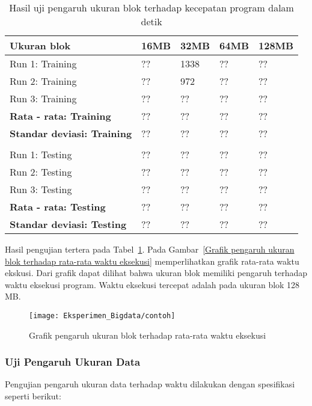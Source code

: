 \begin{table}[H]
\label{tab:uji pengaruh ukuran blok}
\centering
\caption{Hasil uji pengaruh ukuran blok terhadap kecepatan program dalam detik}
\begin{tabular}{ | l | l | l | l | l | }
\hline
Ukuran blok & 16MB & 32MB & 64MB & 128MB \\ \hline \hline
Run 1: Training & ?? & 1338 & ?? & ?? \\ \hline
Run 2: Training & ?? & 972 & ?? & ?? \\ \hline
Run 3: Training & ?? & ?? & ?? & ?? \\ \hline
\textbf{Rata - rata: Training} & ?? & ?? & ?? & ?? \\ \hline
\textbf{Standar deviasi: Training} & ?? & ?? & ?? & ?? \\ \hline
 & & & & \\ \hline
Run 1: Testing & ?? & ?? & ?? & ?? \\ \hline
Run 2: Testing & ?? & ?? & ?? & ?? \\ \hline
Run 3: Testing & ?? & ?? & ?? & ?? \\ \hline
\textbf{Rata - rata: Testing} & ?? & ?? & ?? & ?? \\ \hline
\textbf{Standar deviasi: Testing} & ?? & ?? & ?? & ?? \\ \hline
\end{tabular}
\end{table}

Hasil pengujian tertera pada Tabel~\ref{tab:uji pengaruh ukuran blok}. Pada Gambar~\ref{Grafik pengaruh ukuran blok terhadap rata-rata waktu eksekusi} memperlihatkan grafik rata-rata waktu ekskusi. Dari grafik dapat dilihat bahwa ukuran blok memiliki pengaruh terhadap waktu eksekusi program. Waktu eksekusi tercepat adalah pada ukuran blok 128 MB.

\begin{figure}[H]
	\centering
	\texttt{[image: Eksperimen\_Bigdata/contoh]}
	\caption[Grafik pengaruh ukuran blok terhadap rata-rata waktu eksekusi]{Grafik pengaruh ukuran blok terhadap rata-rata waktu eksekusi}
	\label{fig:Grafik pengaruh ukuran blok terhadap rata-rata waktu eksekusi}
\end{figure}


\subsubsection{Uji Pengaruh Ukuran Data}

Pengujian pengaruh ukuran data terhadap waktu dilakukan dengan spesifikasi seperti berikut:

